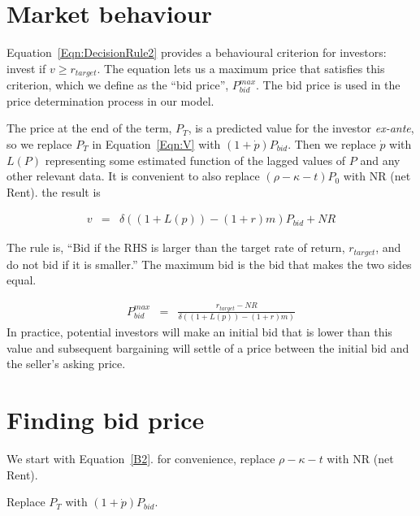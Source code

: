 \section{Market behaviour}
Equation~\ref{Eqn:DecisionRule2} provides a behavioural criterion for investors: invest if $v \geq r_{target}$. The equation lets us a  maximum price that satisfies this criterion, which we define as the ``bid price'', $P^{max}_{bid}$. The bid price is used in the price determination process in our model. 

The  price at the end of the term,  $P_T$, is a predicted value  for the investor \textit{ex-ante}, so we replace $P_T$ in Equation~\ref{Eqn:V} with $(1+\dot p)P_{bid}$. Then we replace $\dot p$ with $L(P)$ representing some estimated function of the lagged values of $P$ and any  other relevant data. It is  convenient to also replace $(\rho -\kappa- t)P_0$ with NR (net Rent). the result is 

\begin{eqnarray}
v %
  &=&\delta\left( (1+L(p)) - (1+r)m \right) P_{bid} + NR  \nonumber
\end{eqnarray}

The rule is, ``Bid if the RHS is larger than the target rate of return, $r_{target}$, and do not bid if it is smaller.''  The maximum bid  is the bid that makes the two sides equal. 

\begin{eqnarray}
   P^{max}_{bid} &=&\frac{r_{target}-NR}{\delta\left( (1+L(p)) - (1+r)m \right)} \label{EqBidPrice} 
\end{eqnarray}
In practice, potential investors will make an  initial  bid that is lower than this value and subsequent bargaining will settle of a price between the initial bid and the seller's asking price.


\section{Finding bid price}
We start with Equation~\ref{B2}. for convenience, replace $\rho   	-\kappa - t $ with NR (net Rent). 

Replace $P_T$ with $(1+\dot p)P_{bid}$.

